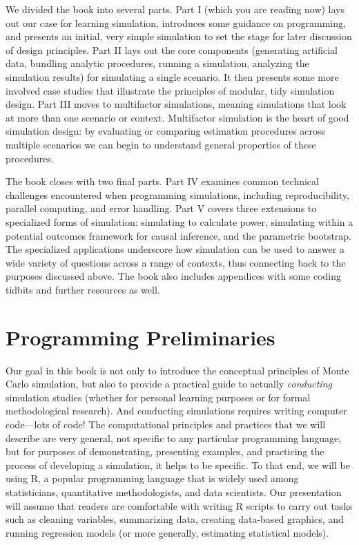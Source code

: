 \documentclass[
]{book}
\begin{document}
We divided the book into several parts.
Part I (which you are reading now) lays out our case for learning simulation, introduces some guidance on programming, and presents an initial, very simple simulation to set the stage for later discussion of design principles.
Part II lays out the core components (generating artificial data, bundling analytic procedures, running a simulation, analyzing the simulation results) for simulating a single scenario. It then presents some more involved case studies that illustrate the principles of modular, tidy simulation design.
Part III moves to multifactor simulations, meaning simulations that look at more than one scenario or context.
Multifactor simulation is the heart of good simulation design: by evaluating or comparing estimation procedures across multiple scenarios we can begin to understand general properties of these procedures.

The book closes with two final parts.
Part IV examines common technical challenges encountered when programming simulations, including reproducibility, parallel computing, and error handling.
Part V covers three extensions to specialized forms of simulation: simulating to calculate power, simulating within a potential outcomes framework for causal inference, and the parametric bootstrap. The specialized applications underscore how simulation can be used to answer a wide variety of questions across a range of contexts, thus connecting back to the purposes discussed above.
The book also includes appendices with some coding tidbits and further resources as well.

\chapter{Programming Preliminaries}\label{programming-preliminaries}

Our goal in this book is not only to introduce the conceptual principles of Monte Carlo simulation, but also to provide a practical guide to actually \emph{conducting} simulation studies (whether for personal learning purposes or for formal methodological research).
And conducting simulations requires writing computer code---lots of code!
The computational principles and practices that we will describe are very general, not specific to any particular programming language, but for purposes of demonstrating, presenting examples, and practicing the process of developing a simulation, it helps to be specific.
To that end, we will be using R, a popular programming language that is widely used among statisticians, quantitative methodologists, and data scientists.
Our presentation will assume that readers are comfortable with writing R scripts to carry out tasks such as cleaning variables, summarizing data, creating data-based graphics, and running regression models (or more generally, estimating statistical models).
\end{document}
